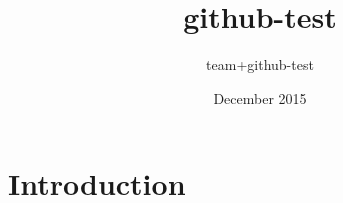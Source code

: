 \documentclass{article}
\title{github-test}
\author{team+github-test }
\date{December 2015}
\begin{document}
\maketitle

\section{Introduction}
\end{document}
